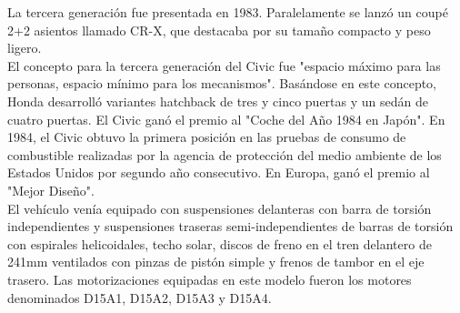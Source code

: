 \documentclass[10pt,a4paper]{report}
\begin{document}
La tercera generación fue presentada en 1983. Paralelamente se lanzó un coupé 2+2 asientos llamado CR-X, que destacaba por su tamaño compacto y peso ligero.\\
El concepto para la tercera generación del Civic fue "espacio máximo para las personas, espacio mínimo para los mecanismos". Basándose en este concepto, Honda desarrolló variantes hatchback de tres y cinco puertas y un sedán de cuatro puertas. El Civic ganó el premio al "Coche del Año 1984 en Japón". En 1984, el Civic obtuvo la primera posición en las pruebas de consumo de combustible realizadas por la agencia de protección del medio ambiente de los Estados Unidos por segundo año consecutivo. En Europa, ganó el premio al "Mejor Diseño".\\
El vehículo venía equipado con suspensiones delanteras con barra de torsión independientes y suspensiones traseras semi-independientes de barras de torsión con espirales helicoidales, techo solar, discos de freno en el tren delantero de 241mm ventilados con pinzas de pistón simple y frenos de tambor en el eje trasero. Las motorizaciones equipadas en este modelo fueron los motores denominados D15A1, D15A2, D15A3 y D15A4.
\\
\end{document}
